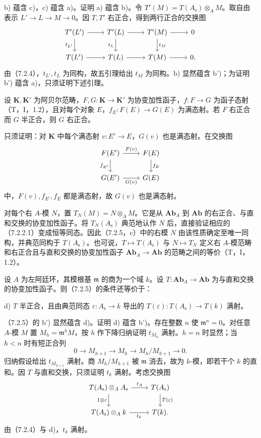 b) 蕴含 c)，c) 蕴含 a)。证明 a) 蕴含 b)。令 $T'(M)=T(A_{\mathrm s})\otimes_A M$。取自由表示 $L'\to L\to M\to0$。因 $T,T'$ 右正合，得到两行正合的交换图
\[
 \begin{tikzcd}
 T'(L')\arrow[r]\arrow[d,"t_{L'}"']&T'(L)\arrow[r]\arrow[d,"t_L"']&T'(M)\arrow[r]\arrow[d,"t_M"]&0\\
 T(L')\arrow[r]&T(L)\arrow[r]&T(M)\arrow[r]&0.
 \end{tikzcd}
\]
由（7.2.4），$t_{L'},t_L$ 为同构，故五引理给出 $t_M$ 为同构。b) 显然蕴含 b')；为证明 b') 蕴含 a)，只须证明下述引理。

设 $\mathbf K,\mathbf K'$ 为阿贝尔范畴，$F,G:\mathbf K\to\mathbf K'$ 为协变加性函子，$f:F\to G$ 为函子态射（T，I，1.2），且对每个对象 $E$，$f_E:F(E)\to G(E)$ 为满态射。若 $F$ 右正合而 $G$ 半正合，则 $G$ 右正合。

只须证明：对 $\mathbf K$ 中每个满态射 $v:E'\to E$，$G(v)$ 也是满态射。在交换图
\[
 \begin{tikzcd}
 F(E')\arrow[r,"F(v)"]\arrow[d,"f_{E'}"']&F(E)\arrow[d,"f_E"]\\
 G(E')\arrow[r,"G(v)"']&G(E)
 \end{tikzcd}
\]
中，$F(v),f_{E'},f_E$ 都是满态射，故 $G(v)$ 也是满态射。

对每个右 $A$-模 $N$，置 $T_N(M)=N\otimes_A M$。它是从 $\mathbf{Ab}_A$ 到 $\mathbf{Ab}$ 的右正合、与直和交换的协变加性函子。将 $T_N(A_{\mathrm s})$ 典范地认作 $N$ 后，直接验证相应的（7.2.2.1）变成恒等同态。因此（7.2.5，c）中的右模 $N$ 由该性质确定至唯一同构，并典范同构于 $T(A_{\mathrm s})$。也可说，$T\mapsto T(A_{\mathrm s})$ 与 $N\mapsto T_N$ 定义右 $A$-模范畴和右正合且与直和交换的协变加性函子 $\mathbf{Ab}_A\to\mathbf{Ab}$ 的范畴之间的等价（T，I，1.2）。

设 $A$ 为左阿廷环，其模根基 $\mathfrak m$ 的商为一个域 $k$。设 $T:\mathbf{Ab}_A\to\mathbf{Ab}$ 为与直和交换的协变加性函子。则（7.2.5）的条件还等价于：

\noindent d) $T$ 半正合，且由典范同态 $\varepsilon:A_{\mathrm s}\to k$ 导出的 $T(\varepsilon):T(A_{\mathrm s})\to T(k)$ 满射。

（7.2.5）的 b') 显然蕴含 d)。证明 d) 蕴含 b')。存在整数 $n$ 使 $\mathfrak m^n=0$。对任意 $A$-模 $M$ 置 $M_h=\mathfrak m^hM$，按 $h$ 作下降归纳证明 $t_{M_h}$ 满射。$h=n$ 时显然；当 $h<n$ 时有短正合列
\[
 0\longrightarrow M_{h+1}\longrightarrow M_h
 \longrightarrow M_h/M_{h+1}\longrightarrow0.
\]
归纳假设给出 $t_{M_{h+1}}$ 满射。商 $M_h/M_{h+1}$ 被 $\mathfrak m$ 消去，故为 $k$-模，即若干个 $k$ 的直和。因 $T$ 与直和交换，只须证明 $t_k$ 满射。考虑交换图
\[
 \begin{tikzcd}
 T(A_{\mathrm s})\otimes_A A_{\mathrm s}\arrow[r,"t_A"]\arrow[d,"1\otimes\varepsilon"']&T(A_{\mathrm s})\arrow[d,"T(\varepsilon)"]\\
 T(A_{\mathrm s})\otimes_A k\arrow[r,"t_k"']&T(k).
 \end{tikzcd}
\]
由（7.2.4）与 d)，$t_k$ 满射。

